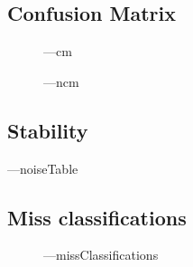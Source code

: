 \documentclass[12pt]{article}
\begin{document}
\subsection{Confusion Matrix}
\begin{figure}[H]
    \centering
    ---cm
\end{figure}
\begin{figure}[H]
    \centering
    ---ncm
\end{figure}
\subsection{Stability}
\begin{table}[H]
    \centering
    ---noiseTable
\end{table}  


\subsection{Miss classifications}
\begin{figure}[H]
    \centering
    ---missClassifications
\end{figure}
\end{document}
